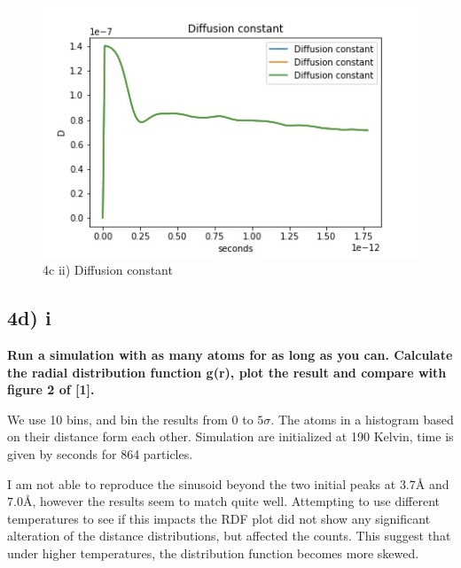 \documentclass[a4paper,10pt,english]{article}
\begin{document}
\begin{figure}[h!]
        \centering 
        \includegraphics[scale=0.6]{./py/4c_ii_diffusionConstant.jpg} 
        \caption{4c ii) Diffusion constant }
        \label{fig:4cii_diffusionconstant}
\end{figure}

\subsection{4d) i}
\textbf{Run a simulation with as many atoms for as long as you can. Calculate the radial distribution
function g(r), plot the result and compare with figure 2 of [1].}

We use 10 bins, and bin the results from $0$ to $5\sigma$. The atoms in a histogram based on their distance form each other. Simulation are initialized at 190 Kelvin, time is given by  $ $seconds for 864 particles. 

I am not able to reproduce the sinusoid beyond the two initial peaks at $3.7Å$ and $7.0 Å$, however the results seem to match quite well. Attempting to use different temperatures to see if this impacts the RDF plot did not show any significant alteration of the distance distributions, but affected the counts. This suggest that under higher temperatures, the distribution function becomes more skewed. 
\end{document}
